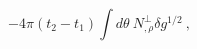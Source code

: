 \begin{equation}
-4\pi(t_2-t_1)\int d\theta \ N^{\perp}_{,\rho} \delta g^{1/2} \ ,
\label{energy}
\end{equation}

